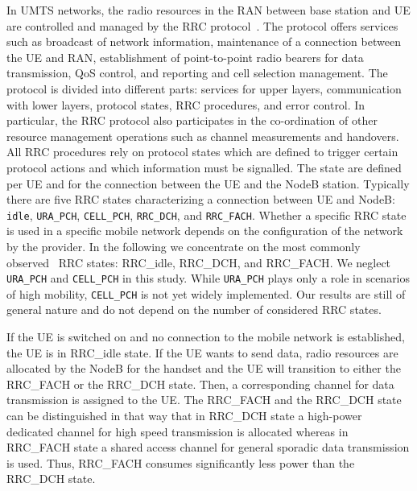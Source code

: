 In UMTS networks, the radio resources in the RAN between base station and UE are controlled and managed by the \gls{RRC} protocol~\cite{3GPP_RRC_Spec}.
The protocol offers services such as broadcast of network information, maintenance of a connection between the \gls{UE} and \gls{RAN}, establishment of point-to-point radio bearers for data transmission, \gls{QoS} control, and reporting and cell selection management.
The protocol is divided into different parts: services for upper layers, communication with lower layers, protocol states, \gls{RRC} procedures, and error control.
In particular, the \gls{RRC} protocol also participates in the co-ordination of other resource management operations such as channel measurements and handovers.
All \gls{RRC} procedures rely on protocol states which are defined to trigger certain protocol actions and which information must be signalled. 
The state are defined per \gls{UE} and for the connection between the \gls{UE} and the \gls{NodeB} station.
Typically there are five \gls{RRC} states characterizing a connection between \gls{UE} and \gls{NodeB}: \texttt{idle}, \texttt{URA\_PCH}, \texttt{CELL\_PCH}, \texttt{RRC\_DCH}, and \texttt{RRC\_FACH}.
Whether a specific \gls{RRC} state is used in a specific mobile network depends on the configuration of the network by the provider.
In the following we concentrate on the most commonly observed~\cite{Qian2010a} \gls{RRC} states: \gls{RRC_idle}, \gls{RRC_DCH}, and \gls{RRC_FACH}.
We neglect \texttt{URA\_PCH} and \texttt{CELL\_PCH} in this study.
While \texttt{URA\_PCH} plays only a role in scenarios of high mobility, \texttt{CELL\_PCH} is not yet widely implemented. 
Our results are still of general nature and do not depend on the number of considered \gls{RRC} states.

If the \gls{UE} is switched on and no connection to the mobile network is established, the \gls{UE} is in \gls{RRC_idle} state.
If the \gls{UE} wants to send data, radio resources are allocated by the \gls{NodeB} for the handset and the \gls{UE} will transition to either the \gls{RRC_FACH} or the \gls{RRC_DCH} state. 
Then, a corresponding channel for data transmission is assigned to the \gls{UE}.
The \gls{RRC_FACH} and the \gls{RRC_DCH} state can be distinguished in that way that in \gls{RRC_DCH} state a high-power dedicated channel for high speed transmission is allocated whereas in \gls{RRC_FACH} state a shared access channel for general sporadic data transmission is used.
Thus, \gls{RRC_FACH} consumes significantly less power than the \gls{RRC_DCH} state. 

